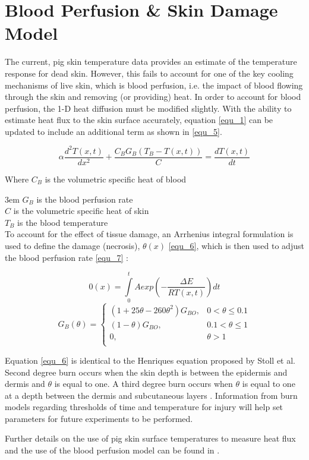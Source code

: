 \clearpage		\large
\chapter{Blood Perfusion \& Skin Damage Model} \label{App:blood_perfusion}

The current, pig skin temperature data provides an estimate of the temperature response for dead skin. However, this fails to account for one of the key cooling mechanisms of live skin, which is blood perfusion, i.e. the impact of blood flowing through the skin and removing (or providing) heat. In order to account for blood perfusion, the 1-D heat diffusion must be modified slightly. With the ability to estimate heat flux to the skin surface accurately, equation \ref{equ_1} can be updated to include an additional term as shown in \ref{equ_5}.

\begin{equation} \label{equ_5} \alpha \frac{d^2T(x,t)}{dx^2} + \frac{C_BG_B(T_B-T(x,t))}{C} = \frac{dT(x,t)}{dt} \end{equation}

Where $C_B$ is the volumetric specific heat of blood

\noindent\hangindent3em
$G_B$ is the blood perfusion rate\\
$C$ is the volumetric specific heat of skin\\
$T_B$ is the blood temperature\\

To account for the effect of tissue damage, an Arrhenius integral formulation is used to define the damage (necrosis), $\theta(x)$ \ref{equ_6}, which is then used to adjust the blood perfusion rate \ref{equ_7} \cite{Torvi_Dale, Abraham_Sparrow}:

\begin{equation} \label{equ_6} 0(x) = \int\limits_0^t A exp(-\frac{\Delta E}{RT(x,t)}) dt \end{equation}
\begin{equation} \label{equ_7} G_B(\theta) = 
\begin{cases}
(1+25\theta-260\theta^2)G_{BO}, 	& 0 < \theta \leq 0.1 \\
(1-\theta)G_{BO},					& 0.1 < \theta \leq 1 \\
0, 									& \theta > 1\\
\end{cases}
\end{equation}

Equation \ref{equ_6} is identical to the Henriques equation proposed by Stoll et al. Second degree burn occurs when the skin depth is between the epidermis and dermis and $\theta$ is equal to one. A third degree burn occurs when $\theta$ is equal to one at a depth between the dermis and subcutaneous layers \cite{Time_Temperature_Cutaneous_Burns}. Information from burn models regarding thresholds of time and temperature for injury will help set parameters for future experiments to be performed.

Further details on the use of pig skin surface temperatures to measure heat flux and the use of the blood perfusion model can be found in \cite{Residential_Tenability}.


